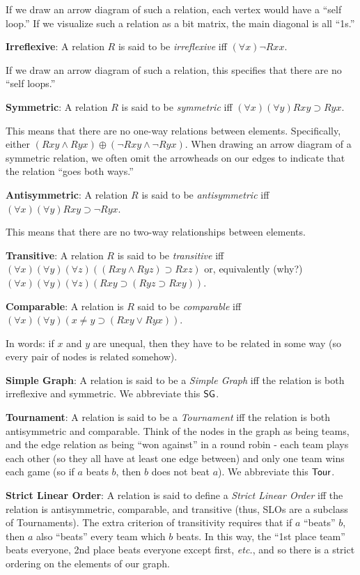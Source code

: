 \begin{mdframed}[linewidth=1]
If we draw an arrow diagram of such a relation, each vertex would have a ``self loop.'' If we visualize such a relation as a bit matrix, the main diagonal is all ``1s.'' 

\textbf{Irreflexive}: A relation $R$ is said to be \emph{irreflexive} iff $(\forall x)\lnot Rxx$.

If we draw an arrow diagram of such a relation, this specifies that there are no ``self loops.'' 

\textbf{Symmetric}: A relation $R$ is said to be \emph{symmetric} iff $(\forall x)(\forall y)Rxy \supset Ryx$.

This means that there are no one-way relations between elements. Specifically, either $(Rxy \land Ryx) \oplus (\lnot Rxy \land \lnot Ryx)$. When drawing an arrow diagram of a symmetric relation, we often omit the arrowheads on our edges to indicate that the relation ``goes both ways.'' 

\textbf{Antisymmetric}: A relation $R$ is said to be \emph{antisymmetric} iff $(\forall x)(\forall y)Rxy \supset \lnot Ryx$.

This means that there are no two-way relationships between elements. 

\textbf{Transitive}: A relation $R$ is said to be \emph{transitive} iff $(\forall x)(\forall y)(\forall z)((Rxy \land Ryz) \supset Rxz)$ or, equivalently (why?) $(\forall x)(\forall y)(\forall z)(Rxy \supset (Ryz \supset Rxy))$.

\textbf{Comparable}: A relation is $R$ said to be \emph{comparable} iff $(\forall x)(\forall y)(x \neq y \supset (Rxy \vee Ryx))$. 

In words: if $x$ and $y$ are unequal, then they have to be related in some way (so every pair of nodes is related somehow). 

\textbf{Simple Graph}: A relation is said to be a \emph{Simple Graph} iff the relation is both irreflexive and symmetric. We abbreviate this $\mbox{$\mathsf{SG}$}$. 

\textbf{Tournament}: A relation is said to be a \emph{Tournament} iff the relation is both antisymmetric and comparable. Think of the nodes in the graph as being teams, and the edge relation as being ``won against'' in a round robin - each team plays each other (so they all have at least one edge between) and only one team wins each game (so if $a$ beats $b$, then $b$ does not beat $a$). We abbreviate this $\mbox{$\mathsf{Tour}$}$. 

\textbf{Strict Linear Order}: A relation is said to define a \emph{Strict Linear Order} iff the relation is antisymmetric, comparable, and transitive (thus, SLOs are a subclass of Tournaments). The extra criterion of transitivity requires that if $a$ ``beats'' $b$, then $a$ also ``beats'' every team which $b$ beats. In this way, the ``1st place team'' beats everyone, 2nd place beats everyone except first, \emph{etc.}, and so there is a strict ordering on the elements of our graph. 


\end{mdframed}
